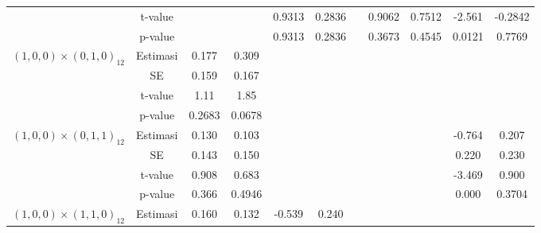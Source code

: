 \begin{enumerate}[label=\alph*.]
\begin{longtable}{|c|c|c|c|c|c|c|c|c|c|c|}
            & t-value
            & {} & {}
            & {0.9313} & {0.2836} & {}
            & {0.9062} & {0.7512}
            & {-2.561} & {-0.2842} \\ \cline{2-11}

            & p-value
            & {} & {}
            & {0.9313} & {0.2836} & {}
            & {0.3673} & {0.4545}
            & {0.0121} & {0.7769} \\ \hline

            \multirow{4}{*}{$(1,0,0)\times(0,1,0)_{12}$}
            & Estimasi
            & {0.177} & {0.309}
            & {} & {} & {}
            & {} & {}
            & {} & {} \\ \cline{2-11}

            & SE
            & {0.159} & {0.167}
            & {} & {} & {}
            & {} & {}
            & {} & {} \\ \cline{2-11}

            & t-value
            & {1.11} & {1.85}
            & {} & {} & {}
            & {} & {}
            & {} & {} \\ \cline{2-11}

            & p-value
            & {0.2683} & {0.0678}
            & {} & {} & {}
            & {} & {}
            & {} & {} \\ \hline

            \multirow{4}{*}{$(1,0,0)\times(0,1,1)_{12}$}
            & Estimasi
            & {0.130} & {0.103}
            & {} & {} & {}
            & {} & {}
            & {-0.764} & {0.207} \\ \cline{2-11}

            & SE
            & {0.143} & {0.150}
            & {} & {} & {}
            & {} & {}
            & {0.220} & {0.230} \\ \cline{2-11}

            & t-value
            & {0.908} & {0.683}
            & {} & {} & {}
            & {} & {}
            & {-3.469} & {0.900} \\ \cline{2-11}

            & p-value
            & {0.366} & {0.4946}
            & {} & {} & {}
            & {} & {}
            & {0.000} & {0.3704} \\ \hline

            \multirow{4}{*}{$(1,0,0)\times(1,1,0)_{12}$}
            & Estimasi
            & {0.160} & {0.132}
            & {-0.539} & {0.240} & {}
            & {} & {}
            & {} & {} \\ \cline{2-11}


\end{longtable}
\end{enumerate}
